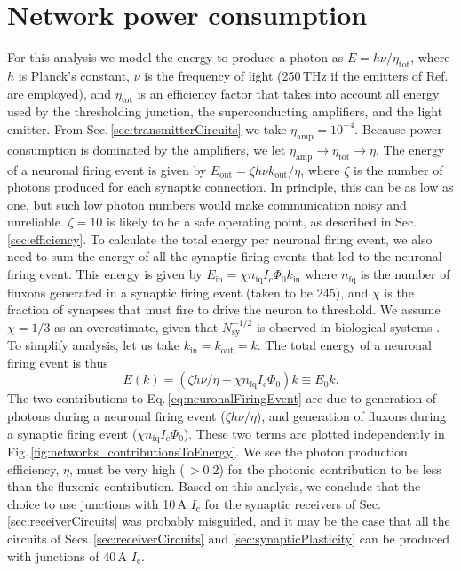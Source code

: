 \documentclass[twocolumn]{article}
\newcommand{\onlinecite}[1]{\hspace{-1 ex} \nocite{#1}\citenum{#1}}
\begin{document}
\section{\label{apx:power}Network power consumption}	
For this analysis we model the energy to produce a photon as $E = h\nu/\eta_{\mathrm{tot}}$, where $h$ is Planck's constant, $\nu$ is the frequency of light (250\,THz if the emitters of Ref.\,\onlinecite{buch2017} are employed), and $\eta_{\mathrm{tot}}$ is an efficiency factor that takes into account all energy used by the thresholding junction, the superconducting amplifiers, and the light emitter. From Sec.\,\ref{sec:transmitterCircuits} we take $\eta_{\mathrm{amp}} = 10^{-4}$. Because power consumption is dominated by the amplifiers, we let $\eta_{\mathrm{amp}}\rightarrow\eta_{\mathrm{tot}}\rightarrow\eta$. The energy of a neuronal firing event is given by $E_{\mathrm{out}} = \zeta h \nu k_{\mathrm{out}}/\eta$, where $\zeta$ is the number of photons produced for each synaptic connection. In principle, this can be as low as one, but such low photon numbers would make communication noisy and unreliable. $\zeta = 10$ is likely to be a safe operating point, as described in Sec.\,\ref{sec:efficiency}. To calculate the total energy per neuronal firing event, we also need to sum the energy of all the synaptic firing events that led to the neuronal firing event. This energy is given by $E_{\mathrm{in}} = \chi n_{\mathrm{fq}} I_c \Phi_0 k_{\mathrm{in}}$ where $n_{\mathrm{fq}}$ is the number of fluxons generated in a synaptic firing event (taken to be 245), and $\chi$ is the fraction of synapses that must fire to drive the neuron to threshold. We assume $\chi = 1/3$ as an overestimate, given that $N_{\mathrm{sy}}^{-1/2}$ is observed in biological systems \cite{vrso1996,vora2005}. To simplify analysis, let us take $k_{\mathrm{in}} = k_{\mathrm{out}} = k$. The total energy of a neuronal firing event is thus
\begin{equation}
\label{eq:neuronalFiringEvent}
E(k) = (\zeta h \nu/\eta + \chi n_{\mathrm{fq}} I_{\mathrm{c}} \Phi_0) k\equiv E_0 k.
\end{equation}
The two contributions to Eq.\,\ref{eq:neuronalFiringEvent} are due to generation of photons during a neuronal firing event ($\zeta h \nu/\eta$), and generation of fluxons during a synaptic firing event ($\chi n_{\mathrm{fq}} I_{\mathrm{c}} \Phi_0$). These two terms are plotted independently in Fig.\,\ref{fig:networks_contributionsToEnergy}. We see the photon production efficiency, $\eta$, must be very high (\,$>0.2$) for the photonic contribution to be less than the fluxonic contribution. Based on this analysis, we conclude that the choice to use junctions with 10\,\textmu A $I_{\mathrm{c}}$ for the synaptic receivers of Sec.\,\ref{sec:receiverCircuits} was probably misguided, and it may be the case that all the circuits of Secs.\,\ref{sec:receiverCircuits} and \ref{sec:synapticPlasticity} can be produced with junctions of 40\,\textmu A $I_{\mathrm{c}}$. 
\end{document}
